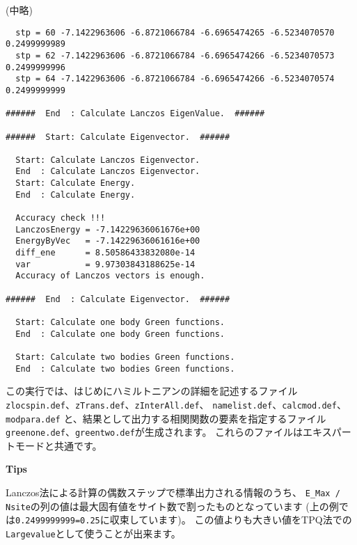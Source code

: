 \normalsize
(中略)
\small
\begin{verbatim}
  stp = 60 -7.1422963606 -6.8721066784 -6.6965474265 -6.5234070570 0.2499999989 
  stp = 62 -7.1422963606 -6.8721066784 -6.6965474266 -6.5234070573 0.2499999996 
  stp = 64 -7.1422963606 -6.8721066784 -6.6965474266 -6.5234070574 0.2499999999 

######  End  : Calculate Lanczos EigenValue.  ######

######  Start: Calculate Eigenvector.  ######

  Start: Calculate Lanczos Eigenvector.
  End  : Calculate Lanczos Eigenvector.
  Start: Calculate Energy.
  End  : Calculate Energy.

  Accuracy check !!!
  LanczosEnergy = -7.14229636061676e+00 
  EnergyByVec   = -7.14229636061616e+00 
  diff_ene      = 8.50586433832080e-14 
  var           = 9.97303843188625e-14 
  Accuracy of Lanczos vectors is enough.

######  End  : Calculate Eigenvector.  ######

  Start: Calculate one body Green functions.
  End  : Calculate one body Green functions.

  Start: Calculate two bodies Green functions.
  End  : Calculate two bodies Green functions.

\end{verbatim}
\normalsize

この実行では、はじめにハミルトニアンの詳細を記述するファイル
\verb|zlocspin.def|、\verb|zTrans.def|、\verb|zInterAll.def|、
\verb|namelist.def|、\verb|calcmod.def|、\verb|modpara.def|
と、結果として出力する相関関数の要素を指定するファイル
\verb|greenone.def|、\verb|greentwo.def|が生成されます。
これらのファイルはエキスパートモードと共通です。

\begin{screen}
\Large 
{\bf Tips}
\normalsize

Lanczos法による計算の偶数ステップで標準出力される情報のうち、
\verb|E_Max / Nsite|の列の値は最大固有値をサイト数で割ったものとなっています
(上の例では\verb|0.2499999999=0.25|に収束しています)。
この値よりも大きい値をTPQ法での\verb|Largevalue|として使うことが出来ます。

\end{screen}

